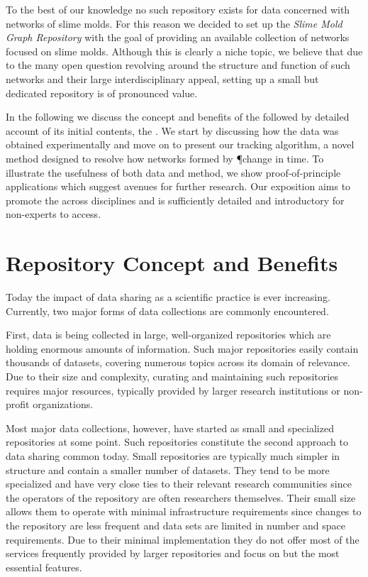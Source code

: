 	To the best of our knowledge no such repository exists for data concerned with networks of slime molds. For this reason we decided to set up the \emph{Slime Mold Graph Repository} with the goal of providing an available collection of networks focused on slime molds. Although this is clearly a niche topic, we believe that due to the many open question revolving around the structure and function of such networks and their large interdisciplinary appeal, setting up a small but dedicated repository is of pronounced value.

	In the following we discuss the concept and benefits of the \SMGR followed by detailed account of its initial contents, the \data. We start by discussing how the data was obtained experimentally and move on to present our tracking algorithm, a novel method designed to resolve how networks formed by \P change in time. To illustrate the usefulness of both data and method, we show proof-of-principle applications which suggest avenues for further research. Our exposition aims to promote the \SMGR across disciplines and is sufficiently detailed and introductory for non-experts to access.
	
\section{Repository Concept and Benefits}
	
	Today the impact of data sharing as a scientific practice is ever increasing. Currently, two major forms of data collections are commonly encountered.

	First, data is being collected in large, well-organized repositories which are holding enormous amounts of information. Such major repositories easily contain thousands of datasets, covering numerous topics across its domain of relevance. Due to their size and complexity, curating and maintaining such repositories requires major resources, typically provided by larger research institutions or non-profit organizations. 

	Most major data collections, however, have started as small and specialized repositories at some point. Such repositories constitute the second approach to data sharing common today. Small repositories are typically much simpler in structure and contain a smaller number of datasets. They tend to be more specialized and have very close ties to their relevant research communities since the operators of the repository are often researchers themselves. Their small size allows them to operate with minimal infrastructure requirements since changes to the repository are less frequent and data sets are limited in number and space requirements. Due to their minimal implementation they do not offer most of the services frequently provided by larger repositories and focus on but the most essential features.

